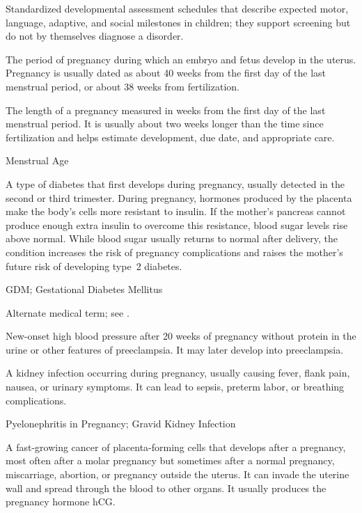  Standardized developmental assessment schedules that describe expected motor, language, adaptive, and social milestones in children; they support screening but do not by themselves diagnose a disorder.

 The period of pregnancy during which an embryo and fetus develop in the uterus. Pregnancy is usually dated as about 40 weeks from the first day of the last menstrual period, or about 38 weeks from fertilization.

 The length of a pregnancy measured in weeks from the first day of the last menstrual period. It is usually about two weeks longer than the time since fertilization and helps estimate development, due date, and appropriate care.

\synonyms
Menstrual Age

 A type of diabetes that first develops during pregnancy, usually detected in the second or third trimester. During pregnancy, hormones produced by the placenta make the body's cells more resistant to insulin. If the mother's pancreas cannot produce enough extra insulin to overcome this resistance, blood sugar levels rise above normal. While blood sugar usually returns to normal after delivery, the condition increases the risk of pregnancy complications and raises the mother's future risk of developing type~2 diabetes.

\synonyms
GDM; Gestational Diabetes Mellitus

 Alternate medical term; see .

 New-onset high blood pressure after 20 weeks of pregnancy without protein in the urine or other features of preeclampsia. It may later develop into preeclampsia.

 A kidney infection occurring during pregnancy, usually causing fever, flank pain, nausea, or urinary symptoms. It can lead to sepsis, preterm labor, or breathing complications.

\synonyms
Pyelonephritis in Pregnancy; Gravid Kidney Infection

 A fast-growing cancer of placenta-forming cells that develops
after a pregnancy, most often after a molar pregnancy but sometimes after a normal pregnancy,
miscarriage, abortion, or pregnancy outside the uterus. It can invade the uterine wall and spread
through the blood to other organs. It usually produces the pregnancy hormone hCG.

